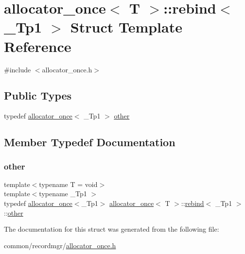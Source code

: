 \hypertarget{structallocator__once_1_1rebind}{}\section{allocator\+\_\+once$<$ T $>$\+:\+:rebind$<$ \+\_\+\+Tp1 $>$ Struct Template Reference}
\label{structallocator__once_1_1rebind}


{\ttfamily \#include $<$allocator\+\_\+once.\+h$>$}

\subsection*{Public Types}
\begin{DoxyCompactItemize}
\item 
typedef \hyperlink{classallocator__once}{allocator\+\_\+once}$<$ \+\_\+\+Tp1 $>$ \hyperlink{structallocator__once_1_1rebind_aac0b19881e10079a780462bace74bbb0}{other}
\end{DoxyCompactItemize}


\subsection{Member Typedef Documentation}
\mbox{\label{structallocator__once_1_1rebind_aac0b19881e10079a780462bace74bbb0}} 
\subsubsection{\texorpdfstring{other}{other}}
{\footnotesize\ttfamily template$<$typename T  = void$>$ \\
template$<$typename \+\_\+\+Tp1 $>$ \\
typedef \hyperlink{classallocator__once}{allocator\+\_\+once}$<$\+\_\+\+Tp1$>$ \hyperlink{classallocator__once}{allocator\+\_\+once}$<$ T $>$\+::\hyperlink{structallocator__once_1_1rebind}{rebind}$<$ \+\_\+\+Tp1 $>$\+::\hyperlink{structallocator__once_1_1rebind_aac0b19881e10079a780462bace74bbb0}{other}}



The documentation for this struct was generated from the following file\+:\begin{DoxyCompactItemize}
\item 
common/recordmgr/\hyperlink{allocator__once_8h}{allocator\+\_\+once.\+h}\end{DoxyCompactItemize}
